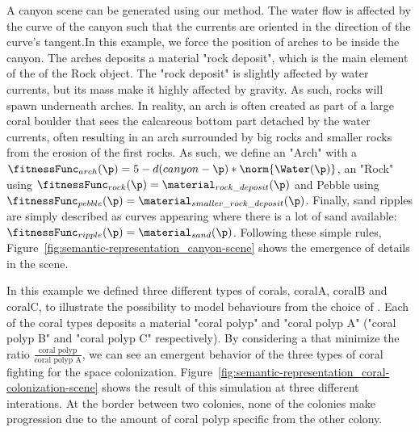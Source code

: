 A canyon scene can be generated using our method. The water flow is affected by the curve of the canyon such that the currents are oriented in the direction of the curve's tangent.In this example, we force the position of arches to be inside the canyon. The arches deposits a material "rock deposit", which is the main element of the  of the Rock object. The "rock deposit" is slightly affected by water currents, but its mass make it highly affected by gravity. As such, rocks will spawn underneath arches. In reality, an arch is often created as part of a large coral boulder that sees the calcareous bottom part detached by the water currents, often resulting in an arch surrounded by big rocks and smaller rocks from the erosion of the first rocks.
As such, we define an  "Arch" with a  $\fitnessFunc_{arch}(\p) = 5 - d(canyon - \p) * \norm{\Water(\p)}$, an  "Rock" using $\fitnessFunc_{rock}(\p) = \material_{rock\_deposit}(\p)$ and Pebble using $\fitnessFunc_{pebble}(\p) = \material_{smaller\_rock\_deposit}(\p)$. Finally, sand ripples are simply described as curves appearing where there is a lot of sand available: $\fitnessFunc_{ripple}(\p) = \material_{sand}(\p)$.
Following these simple rules, Figure~\ref{fig:semantic-representation_canyon-scene} shows the emergence of details in the scene. 

In this example we defined three different types of corals, coralA, coralB and coralC, to illustrate the possibility to model behaviours from the choice of . Each of the coral types deposits a material "coral polyp" and "coral polyp A" ("coral polyp B" and "coral polyp C" respectively). By considering a  that minimize the ratio $\frac{\text{coral polyp}}{\text{coral polyp A}}$, we can see an emergent behavior of the three types of coral fighting for the space colonization.
Figure~\ref{fig:semantic-representation_coral-colonization-scene} shows the result of this simulation at three different interations. At the border between two colonies, none of the colonies make progression due to the amount of coral polyp specific from the other colony.

